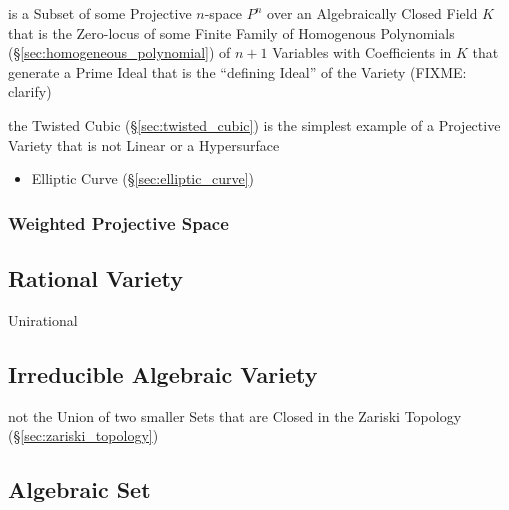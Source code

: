 is a Subset of some Projective $n$-space $\xspace{P}^n$ over an Algebraically
Closed Field $K$ that is the Zero-locus of some Finite Family of Homogenous
Polynomials (\S\ref{sec:homogeneous_polynomial}) of $n + 1$ Variables with
Coefficients in $K$ that generate a Prime Ideal that is the ``defining Ideal''
of the Variety (FIXME: clarify)

the Twisted Cubic (\S\ref{sec:twisted_cubic}) is the simplest example of a
Projective Variety that is not Linear or a Hypersurface

\begin{itemize}
  \item Elliptic Curve (\S\ref{sec:elliptic_curve})
\end{itemize}



\subsubsection{Weighted Projective Space}\label{sec:weighted_projective_space}



\subsection{Rational Variety}\label{sec:rational_variety}

Unirational



\subsection{Irreducible Algebraic Variety}
\label{sec:irreducible_algebraic_variety}

not the Union of two smaller Sets that are Closed in the Zariski Topology
(\S\ref{sec:zariski_topology})



\subsection{Algebraic Set}\label{sec:algebraic_set}

